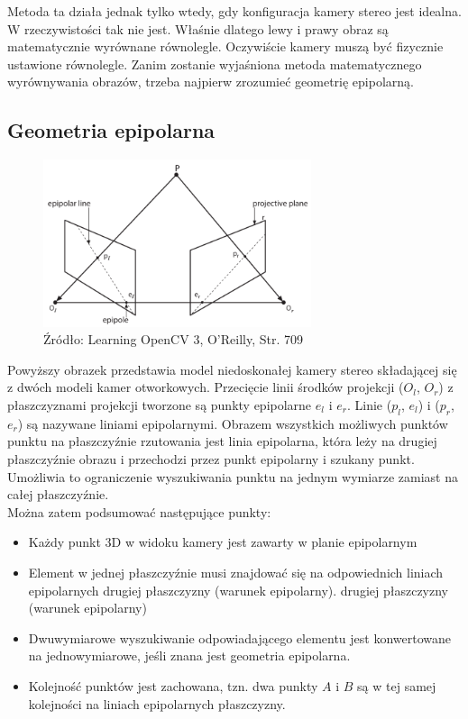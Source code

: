 \documentclass[magisterska]{pracadypl}
\begin{document}
Metoda ta działa jednak tylko wtedy, gdy konfiguracja kamery stereo jest idealna. W
rzeczywistości tak nie jest. Właśnie dlatego lewy i prawy obraz są
matematycznie wyrównane równolegle. Oczywiście kamery muszą być fizycznie ustawione równolegle.
Zanim zostanie wyjaśniona metoda matematycznego wyrównywania obrazów, trzeba najpierw zrozumieć geometrię epipolarną.

\subsection{Geometria epipolarna}

\begin{figure}[h]  %
    \centering  %
    \includegraphics[width=0.7\textwidth]{images/epipolar.png}  %
    \captionsetup{labelformat=empty, font=footnotesize}
    \caption{Źródło: Learning OpenCV 3, O'Reilly, Str. 709}
    \label{fig:rpi}  %
\end{figure}

Powyższy obrazek przedstawia model niedoskonałej kamery stereo składającej się z dwóch modeli kamer otworkowych.
Przecięcie linii środków projekcji ($O_l$, $O_r$) z płaszczyznami projekcji tworzone są punkty epipolarne $e_l$ i $e_r$. Linie ($p_l$, $e_l$) i ($p_r$, $e_r$) są nazywane liniami epipolarnymi. Obrazem wszystkich możliwych punktów punktu
na płaszczyźnie rzutowania jest linia epipolarna, która leży na drugiej płaszczyźnie obrazu i
przechodzi przez punkt epipolarny i szukany punkt. Umożliwia to ograniczenie wyszukiwania punktu na jednym wymiarze zamiast na całej płaszczyźnie.\\
Można zatem podsumować następujące punkty:

\begin{itemize}
  \item Każdy punkt 3D w widoku kamery jest zawarty w planie epipolarnym
  \item Element w jednej płaszczyźnie musi znajdować się na odpowiednich liniach epipolarnych drugiej płaszczyzny (warunek epipolarny).
drugiej płaszczyzny (warunek epipolarny)
  \item Dwuwymiarowe wyszukiwanie odpowiadającego elementu jest konwertowane na
jednowymiarowe, jeśli znana jest geometria epipolarna.
  \item Kolejność punktów jest zachowana, tzn. dwa punkty $A$ i $B$ są w tej samej kolejności na liniach epipolarnych płaszczyzny.

\end{itemize}
\end{document}
